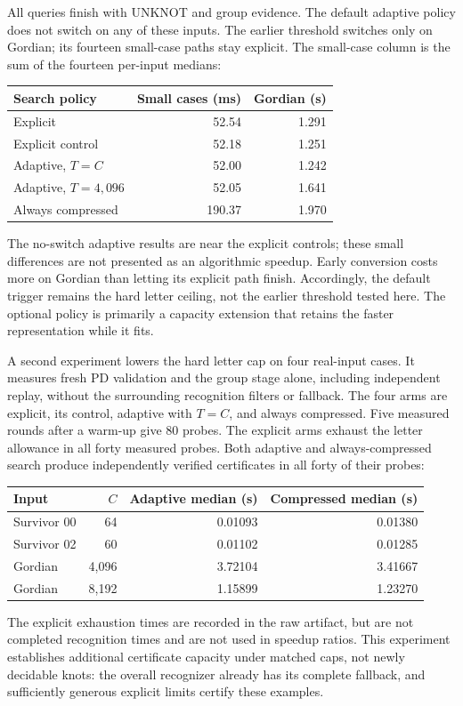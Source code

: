 All queries finish with UNKNOT and group evidence. The default adaptive
policy does not switch on any of these inputs. The earlier threshold
switches only on Gordian; its fourteen small-case paths stay explicit.
The small-case column is the sum of the fourteen per-input medians:
\begin{center}
\begin{tabular}{lrr}
\toprule
Search policy & Small cases (ms) & Gordian (s)\\
\midrule
Explicit & 52.54 & 1.291\\
Explicit control & 52.18 & 1.251\\
Adaptive, $T=C$ & 52.00 & 1.242\\
Adaptive, $T=4{,}096$ & 52.05 & 1.641\\
Always compressed & 190.37 & 1.970\\
\bottomrule
\end{tabular}
\end{center}
The no-switch adaptive results are near the explicit controls; these small
differences are not presented as an algorithmic speedup. Early conversion
costs more on Gordian than letting its explicit path finish. Accordingly,
the default trigger remains the hard letter ceiling, not the earlier
threshold tested here. The optional policy is primarily a capacity
extension that retains the faster representation while it fits.

A second experiment lowers the hard letter cap on four real-input cases.
It measures fresh PD validation and the group stage alone, including
independent replay, without the surrounding recognition filters or fallback.
The four arms are explicit, its control, adaptive with $T=C$, and
always compressed. Five measured rounds after a warm-up give 80 probes.
The explicit arms exhaust the letter allowance in all forty measured
probes. Both adaptive and always-compressed search produce independently
verified certificates in all forty of their probes:
\begin{center}
\begin{tabular}{lrrr}
\toprule
Input & $C$ & Adaptive median (s) & Compressed median (s)\\
\midrule
Survivor 00 & 64 & 0.01093 & 0.01380\\
Survivor 02 & 60 & 0.01102 & 0.01285\\
Gordian & 4,096 & 3.72104 & 3.41667\\
Gordian & 8,192 & 1.15899 & 1.23270\\
\bottomrule
\end{tabular}
\end{center}
The explicit exhaustion times are recorded in the raw artifact, but are
not completed recognition times and are not used in speedup ratios. This
experiment establishes additional certificate capacity under matched caps,
not newly decidable knots: the overall recognizer already has its complete
fallback, and sufficiently generous explicit limits certify these examples.

